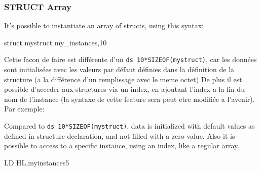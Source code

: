 \begin{xen}
\subsubsection{STRUCT Array}
It's possible to instantiate an array of structs, using this syntax:
\end{xen}

\begin{code}
    struct mystruct my\_instances,10
\end{code}

\begin{xfr}
Cette facon de faire est différente d'un \texttt{ds 10*SIZEOF(mystruct)}, car les données sont initialisées avec les valeurs par défaut définies dans la définition de la structure (a la différence d'un remplissage avec le meme octet)
De plus il est possible d'acceder aux structures via un index, en ajoutant l'index a la fin du nom de l'instance (la syntaxe de cette feature sera peut etre modifiée a l'avenir). Par exemple:
\end{xfr}

\begin{xen}
Compared to \texttt{ds 10*SIZEOF(mystruct)}, data is initialized with default values as defined in structure declaration, and not filled with a zero value.
Also it is possible to access to a specific instance, using an index, like a regular array.
\end{xen}

\begin{code}
  LD HL,myinstances5
\end{code}
